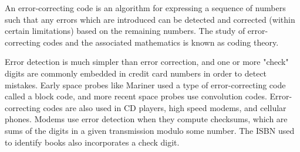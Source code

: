 An error-correcting code is an algorithm for expressing a sequence of numbers such that any errors which are introduced can be detected and corrected (within certain limitations) based on the remaining numbers. The study of error-correcting codes and the associated mathematics is known as coding theory.

Error detection is much simpler than error correction, and one or more "check" digits are commonly embedded in credit card numbers in order to detect mistakes. Early space probes like Mariner used a type of error-correcting code called a block code, and more recent space probes use convolution codes. Error-correcting codes are also used in CD players, high speed modems, and cellular phones. Modems use error detection when they compute checksums, which are sums of the digits in a given transmission modulo some number. The ISBN used to identify books also incorporates a check digit.

